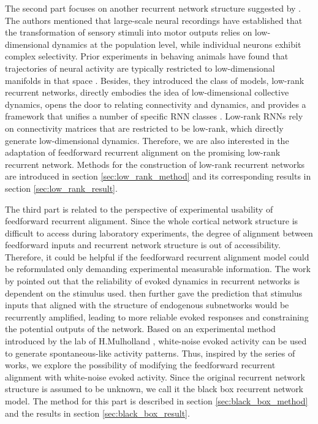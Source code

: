 \documentclass[11pt]{article}
\begin{document}
	The second part focuses on another recurrent network structure suggested by \cite{dubreuil2022role, beiran2021shaping, mastrogiuseppe2018linking}. The authors mentioned that large-scale neural recordings have established that the transformation of sensory stimuli into motor outputs relies on low-dimensional dynamics at the population level, while individual neurons exhibit complex selectivity. Prior experiments in behaving animals  have found that trajectories of neural activity are typically restricted to low-dimensional manifolds in that space \cite{machens2010functional, mante2013context,  rigotti2013importance, gao2015simplicity, gallego2018cortical,  chaisangmongkon2017computing,  wang2018flexible,  sohn2019bayesian}.
	Besides, they introduced the class of models, low-rank recurrent networks, directly embodies the idea of low-dimensional collective dynamics, opens the door to relating connectivity and dynamics, and provides a framework that unifies a number of specific RNN classes \cite{mastrogiuseppe2018linking}. Low-rank RNNs rely on connectivity matrices that are restricted to be low-rank, which directly generate low-dimensional dynamics. 
	Therefore, we are also interested in the adaptation of feedforward recurrent alignment on the promising low-rank recurrent network. Methods for the construction of low-rank recurrent networks are introduced in section \ref{sec:low_rank_method} and its corresponding results in section \ref{sec:low_rank_result}. 
	
	The third part is related to the perspective of experimental usability of feedforward recurrent alignment. Since the whole cortical network structure is difficult to access during laboratory experiments, the degree of alignment between feedforward inputs and recurrent network structure is out of accessibility. Therefore, it could be helpful if the feedforward recurrent alignment model could be reformulated only demanding experimental measurable information. The work by \cite{marre2009reliable} pointed out that the reliability of evoked dynamics in recurrent networks is dependent on the stimulus used. \cite{mulholland2023selective} then further gave the prediction that stimulus inputs that aligned with the structure of endogenous subnetworks would be recurrently amplified, leading to more reliable evoked responses and constraining the potential outputs of the network. Based on an experimental method introduced by the lab of H.Mulholland \cite{cosyne2023}, white-noise evoked activity can be used to generate spontaneous-like activity patterns. Thus, inspired by the series of works, we explore the possibility of modifying the feedforward recurrent alignment with white-noise evoked activity. Since the original recurrent network structure is assumed to be unknown, we call it the black box recurrent network model. The method for this part is described in section \ref{sec:black_box_method} and the results in section \ref{sec:black_box_result}. 
	
\end{document}
